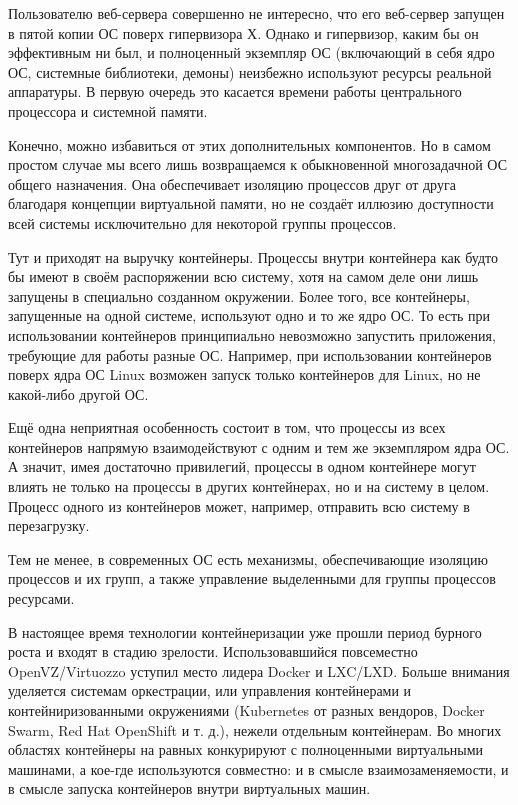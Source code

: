 \documentclass[14pt, a4paper]{article}
\begin{document}
Пользователю веб-сервера совершенно не интересно, что его веб-сервер запущен в пятой копии ОС
поверх гипервизора Х. Однако и гипервизор, каким бы он эффективным ни был, и полноценный
экземпляр ОС (включающий в себя ядро ОС, системные библиотеки, демоны) неизбежно используют
ресурсы реальной аппаратуры. В первую очередь это касается времени работы центрального
процессора и системной памяти.

Конечно, можно избавиться от этих дополнительных компонентов. Но в самом простом случае мы
всего лишь возвращаемся к обыкновенной многозадачной ОС общего назначения. Она обеспечивает
изоляцию процессов друг от друга благодаря концепции виртуальной памяти, но не создаёт иллюзию
доступности всей системы исключительно для некоторой группы процессов.

Тут и приходят на выручку контейнеры. Процессы внутри контейнера как будто бы имеют в своём
распоряжении всю систему, хотя на самом деле они лишь запущены в специально созданном
окружении. Более того, все контейнеры, запущенные на одной системе, используют одно и то же ядро
ОС. То есть при использовании контейнеров принципиально невозможно запустить приложения,
требующие для работы разные ОС. Например, при использовании контейнеров поверх ядра ОС Linux
возможен запуск только контейнеров для Linux, но не какой-либо другой ОС.

Ещё одна неприятная особенность состоит в том, что процессы из всех контейнеров напрямую
взаимодействуют с одним и тем же экземпляром ядра ОС. А значит, имея достаточно привилегий,
процессы в одном контейнере могут влиять не только на процессы в других контейнерах, но и на
систему в целом. Процесс одного из контейнеров может, например, отправить всю систему в
перезагрузку.

Тем не менее, в современных ОС есть механизмы, обеспечивающие изоляцию процессов и их групп,
а также управление выделенными для группы процессов ресурсами.

В настоящее время технологии контейнеризации уже прошли период бурного роста и входят в стадию
зрелости. Использовавшийся повсеместно OpenVZ/Virtuozzo уступил место лидера Docker и LXC/LXD.
Больше внимания уделяется системам оркестрации, или управления контейнерами и
контейниризованными окружениями (Kubernetes от разных вендоров, Docker Swarm, Red Hat
OpenShift и т. д.), нежели отдельным контейнерам. Во многих областях контейнеры на равных
конкурируют с полноценными виртуальными машинами, а кое-где используются совместно: и в
смысле взаимозаменяемости, и в смысле запуска контейнеров внутри виртуальных машин.\\
\end{document}
